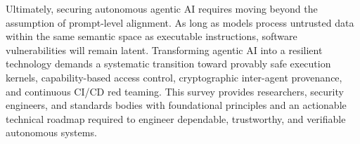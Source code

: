 Ultimately, securing autonomous agentic AI requires moving beyond the assumption of prompt-level alignment. As long as models process untrusted data within the same semantic space as executable instructions, software vulnerabilities will remain latent. Transforming agentic AI into a resilient technology demands a systematic transition toward provably safe execution kernels, capability-based access control, cryptographic inter-agent provenance, and continuous CI/CD red teaming. This survey provides researchers, security engineers, and standards bodies with foundational principles and an actionable technical roadmap required to engineer dependable, trustworthy, and verifiable autonomous systems.
